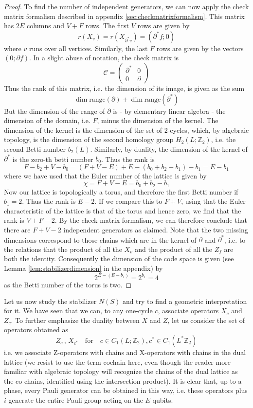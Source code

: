 \documentclass[a4paper, draft]{article}
\theoremstyle{own}
\theoremstyle{remark}
\newcommand{\Z}{\mathbb{Z}}
\begin{document}
\begin{proof}
To find the number of independent generators, we can now apply the check matrix formalism described in appendix \ref{sec:checkmatrixformalism}. This matrix has $2E$ columns and $V + F$ rows. The first $V$ rows are given by
$$
r(X_v) = r(X_{\partial^* v}) = (\partial^* f; 0)
$$
where $v$ runs over all vertices. Similarly, the last $F$ rows are given by the vectors $(0 ; \partial f)$. In a slight abuse of notation, the check matrix is
$$
\mathcal{C}  = \begin{pmatrix} \partial^* & 0 \\ 0 & \partial \end{pmatrix}
$$
Thus the rank of this matrix, i.e. the dimension of its image, is given as the sum
$$
\dim \text{range}(\partial) + \dim \text{range}(\partial^*)
$$
But the dimension of the range of $\partial$ is - by elementary linear algebra - the dimension of the domain, i.e. $F$, minus the dimension of the kernel. The dimension of the kernel is the dimension of the set of 2-cycles, which, by algebraic topology, is the dimension of the second homology group $H_2(L;\Z_2)$, i.e. the second Betti number $b_2(L)$. Similarly, by duality, the dimension of the kernel of $\partial^*$ is the zero-th betti number $b_0$. Thus the rank is
$$
F - b_2 + V - b_0 = (F + V - E) + E - (b_0 + b_2 - b_1) - b_1 = E - b_1
$$
where we have used that the Euler number of the lattice is given by
$$
\chi = F + V - E = b_0 + b_2 - b_1
$$
Now our lattice is topologically a torus, and therefore the first Betti number if $b_1 = 2$. Thus the rank is $E - 2$. If we compare this to $F + V$, using that the Euler characteristic of the lattice is that of the torus and hence zero, we find that the rank is $V + F - 2$. By the check matrix formalism, we can therefore conclude that there are $F + V - 2$ independent generators as claimed. Note that the two missing dimensions correspond to those chains which are in the kernel of $\partial$ and $\partial^*$, i.e. to the relations that the product of all the $X_v$ and the product of all the $Z_f$ are both the identity. Consequently the dimension of the code space is given (see Lemma \ref{lem:stabilizerdimension} in the appendix) by 
$$
2^{E - (E - b_1)} =2^{b_1} = 4
$$
as the Betti number of the torus is two.
\end{proof}



Let us now study the stabilizer $N(S)$ and try to find a geometric interpretation for it. We have seen that we can, to any one-cycle $c$, associate operators $X_c$ and $Z_c$. To further emphasize the duality between $X$ and $Z$, let us consider the set of operators obtained as
$$
Z_c \, , \, X_{c^*} \quad \text{for} \quad c \in C_1(L;\Z_2) , c^* \in C_1(L^*\Z_2)
$$
i.e. we associate Z-operators with chains and X-operators with chains in the dual lattice (we resist to use the term cochain here, even though the reader more familiar with algebraic topology will recognize the chains of the dual lattice as the co-chains, identified using the intersection product). It is clear that, up to a phase, every Pauli generator can be obtained in this way, i.e. these operators plus $i$ generate the entire Pauli group acting on the $E$ qubits.
\end{document}
